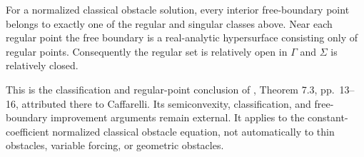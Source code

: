 \begin{theorem}\label{thm:obstacle-dichotomy}
For a normalized classical obstacle solution, every interior free-boundary point belongs to exactly one of the regular and singular classes above. Near each regular point the free boundary is a real-analytic hypersurface consisting only of regular points. Consequently the regular set is relatively open in $\Gamma$ and $\Sigma$ is relatively closed.

This is the classification and regular-point conclusion of \cite{Fig18}, Theorem 7.3, pp.~13--16, attributed there to Caffarelli. Its semiconvexity, classification, and free-boundary improvement arguments remain external. It applies to the constant-coefficient normalized classical obstacle equation, not automatically to thin obstacles, variable forcing, or geometric obstacles.
\end{theorem}
